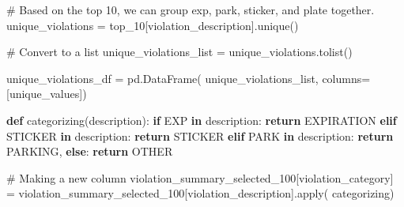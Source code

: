 \documentclass[
  letterpaper,
  DIV=11,
  numbers=noendperiod]{scrartcl}
\newenvironment{Shaded}{\begin{snugshade}}{\end{snugshade}}
\newcommand{\BuiltInTok}[1]{\textcolor[rgb]{0.00,0.23,0.31}{#1}}
\newcommand{\CommentTok}[1]{\textcolor[rgb]{0.37,0.37,0.37}{#1}}
\newcommand{\ControlFlowTok}[1]{\textcolor[rgb]{0.00,0.23,0.31}{\textbf{#1}}}
\newcommand{\KeywordTok}[1]{\textcolor[rgb]{0.00,0.23,0.31}{\textbf{#1}}}
\newcommand{\NormalTok}[1]{\textcolor[rgb]{0.00,0.23,0.31}{#1}}
\newcommand{\OperatorTok}[1]{\textcolor[rgb]{0.37,0.37,0.37}{#1}}
\newcommand{\StringTok}[1]{\textcolor[rgb]{0.13,0.47,0.30}{#1}}
\begin{document}
\begin{Shaded}
\begin{Highlighting}[]
\CommentTok{\# Based on the top 10, we can group exp, park, sticker, and plate together.}
\NormalTok{unique\_violations }\OperatorTok{=}\NormalTok{ top\_10[}\StringTok{\textquotesingle{}violation\_description\textquotesingle{}}\NormalTok{].unique()}

\CommentTok{\# Convert to a list}
\NormalTok{unique\_violations\_list }\OperatorTok{=}\NormalTok{ unique\_violations.tolist()}

\NormalTok{unique\_violations\_df }\OperatorTok{=}\NormalTok{ pd.DataFrame(}
\NormalTok{    unique\_violations\_list, columns}\OperatorTok{=}\NormalTok{[}\StringTok{\textquotesingle{}unique\_values\textquotesingle{}}\NormalTok{])}


\KeywordTok{def}\NormalTok{ categorizing(description):}
    \ControlFlowTok{if} \StringTok{\textquotesingle{}EXP\textquotesingle{}} \KeywordTok{in}\NormalTok{ description:}
        \ControlFlowTok{return} \StringTok{\textquotesingle{}EXPIRATION\textquotesingle{}}
    \ControlFlowTok{elif} \StringTok{\textquotesingle{}STICKER\textquotesingle{}} \KeywordTok{in}\NormalTok{ description:}
        \ControlFlowTok{return} \StringTok{\textquotesingle{}STICKER\textquotesingle{}}
    \ControlFlowTok{elif} \StringTok{\textquotesingle{}PARK\textquotesingle{}} \KeywordTok{in}\NormalTok{ description:}
        \ControlFlowTok{return} \StringTok{\textquotesingle{}PARKING\textquotesingle{}}\NormalTok{,}
    \ControlFlowTok{else}\NormalTok{:}
        \ControlFlowTok{return} \StringTok{\textquotesingle{}OTHER\textquotesingle{}}

\CommentTok{\# Making a new column}
\NormalTok{violation\_summary\_selected\_100[}\StringTok{\textquotesingle{}violation\_category\textquotesingle{}}\NormalTok{] }\OperatorTok{=}\NormalTok{ violation\_summary\_selected\_100[}\StringTok{\textquotesingle{}violation\_description\textquotesingle{}}\NormalTok{].}\BuiltInTok{apply}\NormalTok{(}
\NormalTok{    categorizing)}


\end{Highlighting}
\end{Shaded}
\end{document}
